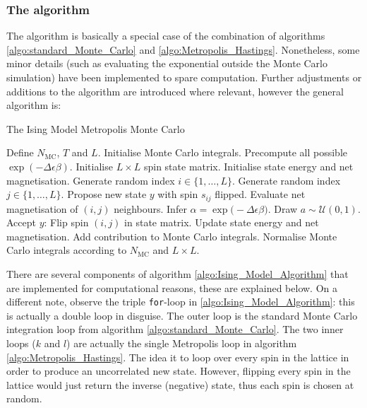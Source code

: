 \documentclass[nofootinbib,reprint,english]{revtex4-1}
\begin{document}
\subsubsection{The algorithm}
The algorithm is basically a special case of the combination of algorithms \ref{algo:standard_Monte_Carlo} and \ref{algo:Metropolis_Hastings}. Nonetheless, some minor details (such as evaluating the exponential outside the Monte Carlo simulation) have been implemented to spare computation. Further adjustments or additions to the algorithm are introduced where relevant, however the general algorithm is:
\begin{algorithm}[H]
\caption{The Ising Model Metropolis Monte Carlo}\label{algo:Ising_Model_Algorithm}
\begin{algorithmic}[1]
\State Define \(N_\text{MC}\), \(T\) and \(L\).
\State Initialise Monte Carlo integrals.
\State Precompute all possible \(\exp(-\Delta\epsilon\beta)\).
\State Initialise \(L\times L\) spin state matrix.
\State Initialise state energy and net magnetisation.
			\State Generate random index \(i\in\{1,\ldots,L\}\).
			\State Generate random index \(j\in\{1,\ldots,L\}\).
			\State Propose new state \(y\) with spin \(s_{ij}\) flipped.
			\State Evaluate net magnetisation of \((i,j)\) neighbours.
			\State Infer \(\alpha=\exp\big(-\Delta\epsilon\beta\big)\).
			\State Draw \(a\sim\mathcal{U}(0,1)\).
				\State Accept \(y\): Flip spin \((i,j)\) in state matrix.
				\State Update state energy and net magnetisation.
			\EndIf
		\EndFor
	\EndFor
	\State Add contribution to Monte Carlo integrals.
\EndFor
\State Normalise Monte Carlo integrals according to \(N_\text{MC}\) and \(L\times L\).
\end{algorithmic}
\end{algorithm}
There are several components of algorithm \ref{algo:Ising_Model_Algorithm} that are implemented for computational reasons, these are explained below. On a different note, observe the triple \texttt{for}-loop in \ref{algo:Ising_Model_Algorithm}: this is actually a double loop in disguise. The outer loop is the standard Monte Carlo integration loop from algorithm \ref{algo:standard_Monte_Carlo}. The two inner loops (\(k\) and \(l\)) are actually the single Metropolis loop in algorithm \ref{algo:Metropolis_Hastings}. The idea it to loop over every spin in the lattice in order to produce an uncorrelated new state. However, flipping every spin in the lattice would just return the inverse (negative) state, thus each spin is chosen at random.
\end{document}
